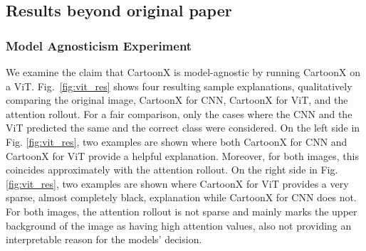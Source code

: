 \subsection{Results beyond original paper}
 
\subsubsection{Model Agnosticism Experiment} 
We examine the claim that CartoonX is model-agnostic by running CartoonX on a ViT.
Fig.~\ref{fig:vit_res} shows four resulting sample explanations, qualitatively comparing the original image, CartoonX for CNN, CartoonX for ViT, and the attention rollout. For a fair comparison, only the cases where the CNN and the ViT predicted the same and the correct class were considered. 
On the left side in Fig. \ref{fig:vit_res}, two examples are shown where both CartoonX for CNN and CartoonX for ViT provide a helpful explanation.
Moreover, for both images, this coincides approximately with the attention rollout.
On the right side in Fig. \ref{fig:vit_res}, two examples are shown where CartoonX for ViT provides a very sparse, almost completely black, explanation while CartoonX for CNN does not. 
For both images, the attention rollout is not sparse and mainly marks the upper background of the image as having high attention values, also not providing an interpretable reason for the models' decision. %

